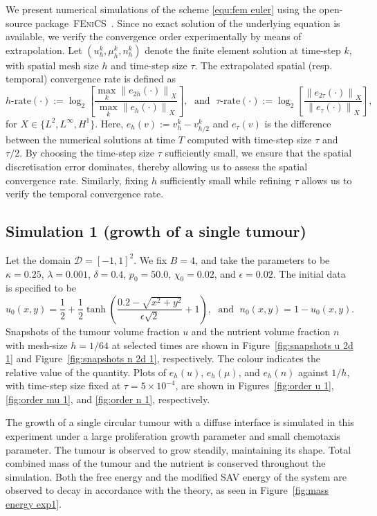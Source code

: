 \documentclass[11pt, reqno]{amsart}
\theoremstyle{definition}
\numberwithin{equation}{section}
\newcommand{\norm}[2]{\left\|{#1}\right\|_{#2}}
\begin{document}
We present numerical simulations of the scheme \eqref{equ:fem euler} using the open-source package~\textsc{FEniCS}~\cite{AlnaesEtal15}. Since no exact solution of the underlying equation is available, we verify the convergence order experimentally by means of extrapolation. Let $\left(u_h^k, \mu_h^k, n_h^k \right)$ denote the finite element solution at time-step $k$, with spatial mesh size $h$ and time-step size $\tau$. The extrapolated spatial (resp. temporal) convergence rate is defined as
\begin{equation*}
	h\text{-rate}(\cdot) :=  \log_2 \left[\frac{\max_k \norm{e_{2h}(\cdot)}{X}}{\max_k \norm{e_{h}(\cdot)}{X}}\right], \; \text{ and } \; 
    \tau\text{-rate}(\cdot) :=  \log_2 \left[\frac{ \norm{e_{2\tau}(\cdot)}{X}}{\norm{e_{\tau}(\cdot)}{X}}\right],
\end{equation*}
for $X \in \{L^2, L^\infty, H^1\}$. Here, $e_h(v) := v_{h}^k - v_{h/2}^k$ and $e_\tau(v)$ is the difference between the numerical solutions at time $T$ computed with time-step size $\tau$ and $\tau/2$. By choosing the time-step size $\tau$ sufficiently small, we ensure that the spatial discretisation error dominates, thereby allowing us to assess the spatial convergence rate. Similarly, fixing $h$ sufficiently small while refining $\tau$ allows us to verify the temporal convergence rate.

\subsection{Simulation 1 (growth of a single tumour)}

Let the domain $\mathscr{D}=[-1,1]^2$. We fix $B=4$, and take the parameters to be $\kappa=0.25$, $\lambda=0.001$, $\delta=0.4$, $p_0=50.0$, $\chi_0=0.02$, and $\epsilon=0.02$. The initial data is specified to be
\[
    u_0(x,y)=\frac12 + \frac12 \tanh\left(\frac{0.2-\sqrt{x^2+y^2}}{\epsilon\sqrt{2}} + 1\right),
    \;\text{ and }\; 
    n_0(x,y)=1-u_0(x,y).
\]
Snapshots of the tumour volume fraction $u$ and the nutrient volume fraction $n$ with mesh-size $h=1/64$ at selected times are shown in Figure~\ref{fig:snapshots u 2d 1} and Figure~\ref{fig:snapshots n 2d 1}, respectively. The colour indicates the relative value of the quantity. Plots of $e_h(u)$, $e_h(\mu)$, and $e_h(n)$ against $1/h$, with time-step size fixed at $\tau=5\times 10^{-4}$, are shown in Figures~\ref{fig:order u 1}, \ref{fig:order mu 1}, and \ref{fig:order n 1}, respectively.

The growth of a single circular tumour with a diffuse interface is simulated in this experiment under a large proliferation growth parameter and small chemotaxis parameter. The tumour is observed to grow steadily, maintaining its shape. Total combined mass of the tumour and the nutrient is conserved throughout the simulation. Both the free energy and the modified SAV energy of the system are observed to decay in accordance with the theory, as seen in Figure~\ref{fig:mass energy exp1}.
\end{document}
